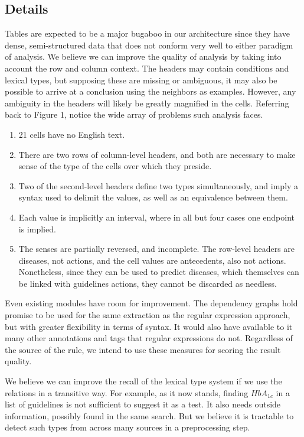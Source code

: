 \documentclass[12pt,letterpaper]{article}
\begin{document}
\subsection*{Details}
Tables are expected to be a major bugaboo in our architecture since they have dense, semi-structured data that does not conform very well to either paradigm of analysis. We believe we can improve the quality of analysis by taking into account the row and column context. The headers may contain conditions and lexical types, but supposing these are missing or ambiguous, it may also be possible to arrive at a conclusion using the neighbors as examples. However, any ambiguity in the headers will likely be greatly magnified in the cells. Referring back to Figure 1, notice the wide array of problems such analysis faces.
\begin{enumerate}
\item 21 cells have no English text.
\item There are two rows of column-level headers, and both are necessary to make sense of the type of the cells over which they preside.
\item Two of the second-level headers define two types simultaneously, and imply a syntax used to delimit the values, as well as an equivalence between them. 
\item Each value is implicitly an interval, where in all but four cases one endpoint is implied.
\item The senses are partially reversed, and incomplete. The row-level headers are diseases, not actions, and the cell values are antecedents, also not actions. Nonetheless, since they can be used to predict diseases, which themselves can be linked with guidelines actions, they cannot be discarded as needless.
\end{enumerate}

Even existing modules have room for improvement. The dependency graphs hold promise to be used for the same extraction as the regular expression approach, but with greater flexibility in terms of syntax. It would also have available to it many other annotations and tags that regular expressions do not. Regardless of the source of the rule, we intend to use these measures for scoring the result quality.

We believe we can improve the recall of the lexical type system if we use the relations in a transitive way. For example, as it now stands, finding $HbA_{1c}$ in a list of guidelines is not sufficient to suggest it as a test. It also needs outside information, possibly found in the same search. But we believe it is tractable to detect such types from across many sources in a preprocessing step. 
\end{document}
